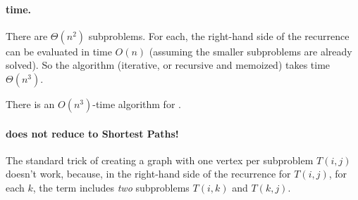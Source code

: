 \paragraph{time.}
There are $\Theta(n^2)$ subproblems.
For each, the right-hand side of the recurrence can be evaluated in time $O(n)$
(assuming the smaller subproblems are already solved).
So the algorithm (iterative, or recursive and memoized)
takes time $\Theta(n^3)$.

\begin{theorem}
  There is an $O(n^3)$-time algorithm for .
\end{theorem}

\paragraph{does not reduce to Shortest Paths!}
The standard trick of creating a graph with one vertex per subproblem $T(i,j)$
doesn't work, because, in the right-hand side of the recurrence for $T(i,j)$,
for each $k$, the term includes \emph{two} subproblems $T(i,k)$ and $T(k,j)$.




  

